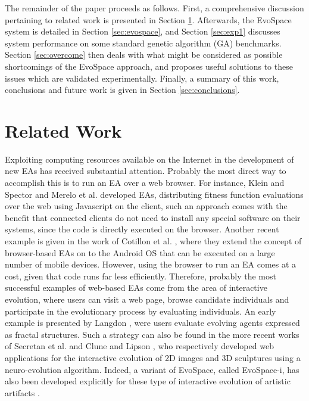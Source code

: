 The remainder of the paper proceeds as follows.
First, a comprehensive discussion pertaining to related work is presented in Section \ref{sec:related}.
Afterwards, the EvoSpace system is detailed in Section \ref{sec:evospace}, and Section 
\ref{sec:exp1} discusses system performance on some standard genetic algorithm (GA) benchmarks.
Section \ref{sec:overcome} then deals with what might be considered as possible shortcomings of the EvoSpace approach,
and proposes useful solutions to these issues which are validated experimentally.
Finally, a summary of this work, conclusions and future work is given in Section \ref{sec:conclusions}.
 


\section{Related Work}
\label{sec:related}
Exploiting computing resources available on the Internet in the development of  new EAs has received substantial attention. Probably the most direct way to accomplish this is to run an EA over a web browser.
For instance, Klein and Spector \cite{spector:2007} and Merelo et al. \cite{merelo:2008} developed EAs, distributing fitness function evaluations over the web using Javascript on the client, such an approach comes with the benefit that connected clients do not need to install any special software on their systems, since the code is directly executed on the browser.
Another recent example is given in the work of Cotillon et al. \cite{cotillon:2012}, where they extend the concept of browser-based EAs on to the Android OS that can be
executed on a large number of mobile devices.
However, using the browser to run an EA comes at a cost, given that code runs far less efficiently.
Therefore, probably the most successful examples of web-based EAs come from the area of interactive evolution,
where users can visit a web page, browse candidate individuals and participate in the evolutionary process by evaluating individuals.
An early example is presented by Langdon \cite{langdon:2004}, were users evaluate evolving agents expressed as fractal structures.
Such a strategy can also be found in the more recent works of Secretan et al. \cite{picbreeder} and Clune and Lipson \cite{forms}, who respectively developed web applications for the interactive
evolution of 2D images and 3D sculptures using a neuro-evolution algorithm.
Indeed, a variant of EvoSpace, called EvoSpace-i, has also been developed explicitly for these type of interactive evolution of artistic artifacts \cite{Musart,Fire}.


